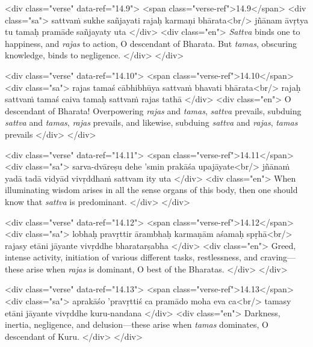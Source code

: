 \begin{html}
<div class="verse" data-ref="14.9">
  <span class="verse-ref">14.9</span>
  <div class="sa">
    sattvaṁ sukhe sañjayati rajaḥ karmaṇi bhārata<br/>
    jñānam āvṛtya tu tamaḥ pramāde sañjayaty uta
  </div>
  <div class="en">
    \textit{Sattva} binds one to happiness, and \textit{rajas} to action, O descendant of Bharata. But \textit{tamas}, obscuring knowledge, binds to negligence.
  </div>
</div>
\end{html}



\begin{html}
<div class="verse" data-ref="14.10">
  <span class="verse-ref">14.10</span>
  <div class="sa">
    rajas tamaś cābhibhūya sattvaṁ bhavati bhārata<br/>
    rajaḥ sattvaṁ tamaś caiva tamaḥ sattvaṁ rajas tathā
  </div>
  <div class="en">
    O descendant of Bharata! Overpowering \textit{rajas} and \textit{tamas}, \textit{sattva} prevails, subduing \textit{sattva} and \textit{tamas}, \textit{rajas} prevails, and likewise, subduing \textit{sattva} and \textit{rajas}, \textit{tamas} prevails
  </div>
</div>
\end{html}



\begin{html}
<div class="verse" data-ref="14.11">
  <span class="verse-ref">14.11</span>
  <div class="sa">
    sarva-dvāreṣu dehe ’smin prakāśa upajāyate<br/>
    jñānaṁ yadā tadā vidyād vivṛddhaṁ sattvam ity uta
  </div>
  <div class="en">
    When illuminating wisdom arises in all the sense organs of this body, then one should know that \textit{sattva} is predominant.
  </div>
</div>
\end{html}



\begin{html}
<div class="verse" data-ref="14.12">
  <span class="verse-ref">14.12</span>
  <div class="sa">
    lobhaḥ pravṛttir ārambhaḥ karmaṇām aśamaḥ spṛhā<br/>
    rajasy etāni jāyante vivṛddhe bharatarṣabha
  </div>
  <div class="en">
    Greed, intense activity, initiation of various different tasks, restlessness, and craving---these arise when \textit{rajas} is dominant, O best of the Bharatas.
  </div>
</div>
\end{html}



\begin{html}
<div class="verse" data-ref="14.13">
  <span class="verse-ref">14.13</span>
  <div class="sa">
    aprakāśo ’pravṛttiś ca pramādo moha eva ca<br/>
    tamasy etāni jāyante vivṛddhe kuru-nandana
  </div>
  <div class="en">
    Darkness, inertia, negligence, and delusion---these arise when \textit{tamas} dominates, O descendant of Kuru.
  </div>
</div>
\end{html}



